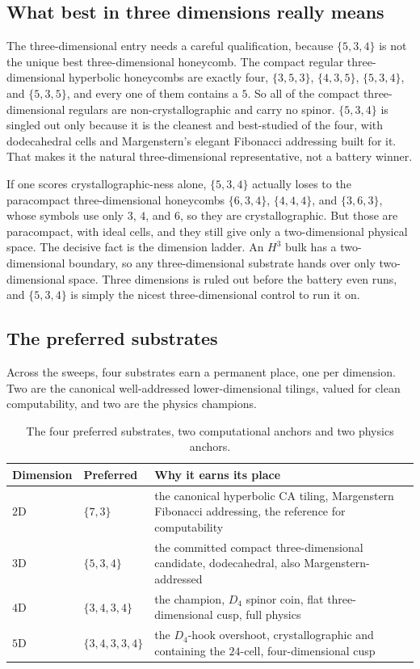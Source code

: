 \subsection{What best in three dimensions really means}

The three-dimensional entry needs a careful qualification, because $\{5,3,4\}$ is not the unique best
three-dimensional honeycomb. The compact regular three-dimensional hyperbolic honeycombs are exactly four,
$\{3,5,3\}$, $\{4,3,5\}$, $\{5,3,4\}$, and $\{5,3,5\}$, and every one of them contains a $5$. So all of the
compact three-dimensional regulars are non-crystallographic and carry no spinor. $\{5,3,4\}$ is singled out only
because it is the cleanest and best-studied of the four, with dodecahedral cells and Margenstern's elegant
Fibonacci addressing built for it. That makes it the natural three-dimensional representative, not a battery
winner.

If one scores crystallographic-ness alone, $\{5,3,4\}$ actually loses to the paracompact three-dimensional
honeycombs $\{6,3,4\}$, $\{4,4,4\}$, and $\{3,6,3\}$, whose symbols use only $3$, $4$, and $6$, so they are
crystallographic. But those are paracompact, with ideal cells, and they still give only a two-dimensional
physical space. The decisive fact is the dimension ladder. An $H^3$ bulk has a two-dimensional boundary, so any
three-dimensional substrate hands over only two-dimensional space. Three dimensions is ruled out before the
battery even runs, and $\{5,3,4\}$ is simply the nicest three-dimensional control to run it on.

\subsection{The preferred substrates}

Across the sweeps, four substrates earn a permanent place, one per dimension. Two are the canonical
well-addressed lower-dimensional tilings, valued for clean computability, and two are the physics champions.

\begin{table}[ht]
\centering
\begin{tabular}{p{1.6cm}p{2.3cm}p{7.6cm}}
\toprule
Dimension & Preferred & Why it earns its place \\
\midrule
$2$D & $\{7,3\}$ & the canonical hyperbolic CA tiling, Margenstern Fibonacci addressing, the reference for computability \\
$3$D & $\{5,3,4\}$ & the committed compact three-dimensional candidate, dodecahedral, also Margenstern-addressed \\
$4$D & $\{3,4,3,4\}$ & the champion, $D_4$ spinor coin, flat three-dimensional cusp, full physics \\
$5$D & $\{3,4,3,3,4\}$ & the $D_4$-hook overshoot, crystallographic and containing the $24$-cell, four-dimensional cusp \\
\bottomrule
\end{tabular}
\caption{The four preferred substrates, two computational anchors and two physics anchors.}
\end{table}


